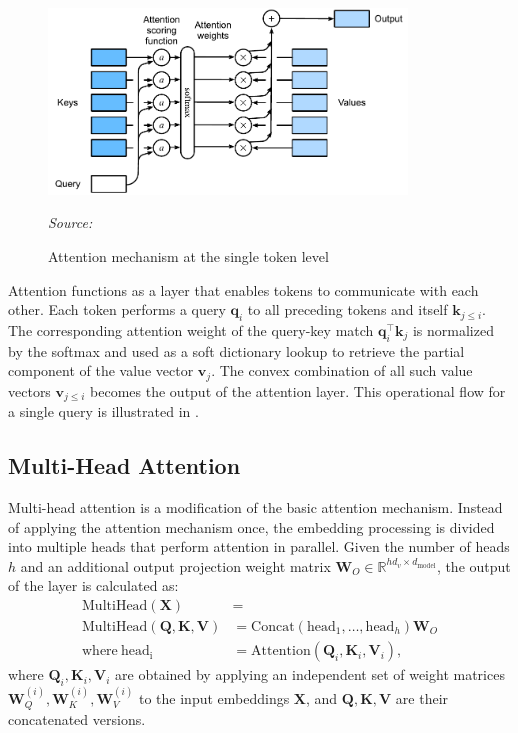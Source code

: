 \begin{figure}[ht]
    \centering
    \includegraphics[width=0.85\textwidth]{figures/attention.pdf}
    \caption{Attention mechanism at the single token level}\label{fig:attention}
    \hfill\textit{Source: \citet{zhang2023b}}
\end{figure}

Attention functions as a layer that enables tokens to communicate with each other. Each token performs a query \(\mathbf{q}_i\) to all preceding tokens and itself \(\mathbf{k}_{j \le i}\). The corresponding attention weight of the query-key match \(\mathbf{q}_{i}^\top\mathbf{k}_{j}\) is normalized by the softmax and used as a soft dictionary lookup to retrieve the partial component of the value vector \(\mathbf{v}_j\). The convex combination of all such value vectors \(\mathbf{v}_{j \le i}\) becomes the output of the attention layer. This operational flow for a single query is illustrated in .

\subsection{Multi-Head Attention}

Multi-head attention is a modification of the basic attention mechanism. Instead of applying the attention mechanism once, the embedding processing is divided into multiple heads that perform attention in parallel. Given the number of heads \(h\) and an additional output projection weight matrix \(\mathbf{W}_O \in \mathbb{R}^{hd_v \times d_{\mathrm{model}}}\), the output of the layer is calculated as:
\begin{align}
    \mathrm{MultiHead}(\mathbf{X}) &= \\ \mathrm{MultiHead}(\mathbf{Q}, \mathbf{K}, \mathbf{V}) &= \mathrm{Concat}(\mathrm{head}_1, \ldots, \mathrm{head}_h) \mathbf{W}_O \\
    \text{where}~\mathrm{head_i} &= \mathrm{Attention}(\mathbf{Q}_i, \mathbf{K}_i, \mathbf{V}_i),
\end{align}
where \(\mathbf{Q}_i, \mathbf{K}_i, \mathbf{V}_i\) are obtained by applying an independent set of weight matrices \(\mathbf{W}_Q^{(i)}, \mathbf{W}_K^{(i)}, \mathbf{W}_V^{(i)}\) to the input embeddings \(\mathbf{X}\), and \(\mathbf{Q}, \mathbf{K}, \mathbf{V}\) are their concatenated versions.

